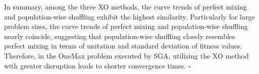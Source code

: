\documentclass{article}
\begin{document}
\begin{enumerate}[label=(\alph*)]
      In summary, among the three XO methods, the curve trends of perfect mixing and 
      population-wise shuffling exhibit the highest similarity. Particularly for large problem sizes, 
      the curve trends of perfect mixing and population-wise shuffling nearly coincide, suggesting that 
      population-wise shuffling closely resembles perfect mixing in terms of unitation and standard deviation of fitness values. 
      Therefore, in the OneMax problem executed by SGA, utilizing the XO method with greater disruption 
       leads to shorter convergence times.
      \hfill $\square$

\end{enumerate}

























\end{document}
